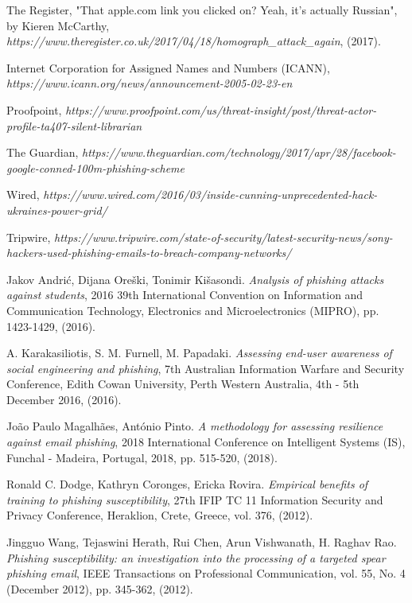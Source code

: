 \documentclass[a4paper]{article}
\begin{document}
\begin{thebibliography}{1}
The Register, "That apple.com link you clicked on? Yeah, it's actually Russian", by Kieren McCarthy, \textit{https://www.theregister.co.uk/2017/04/18/homograph\_attack\_again}, (2017).

Internet Corporation for Assigned Names and Numbers (ICANN),
\textit{https://www.icann.org/news/announcement-2005-02-23-en}

Proofpoint, \textit{https://www.proofpoint.com/us/threat-insight/post/threat-actor-profile-ta407-silent-librarian}

The Guardian, \textit{https://www.theguardian.com/technology/2017/apr/28/facebook-google-conned-100m-phishing-scheme}

Wired, \textit{https://www.wired.com/2016/03/inside-cunning-unprecedented-hack-ukraines-power-grid/}

Tripwire, \textit{https://www.tripwire.com/state-of-security/latest-security-news/sony-hackers-used-phishing-emails-to-breach-company-networks/}


Jakov Andrić, Dijana Oreški, Tonimir Kišasondi. \emph{Analysis of phishing attacks against students}, 2016 39th International Convention on Information and Communication Technology, Electronics and Microelectronics (MIPRO), pp. 1423-1429, (2016).

A. Karakasiliotis, S. M. Furnell, M. Papadaki. \emph{Assessing end-user awareness of social engineering
and phishing}, 7th Australian Information Warfare and Security Conference, Edith Cowan University, Perth Western Australia, 4th - 5th December 2016, (2016).

João Paulo Magalhães, António Pinto. \emph{A methodology for assessing resilience against email phishing}, 2018 International Conference on Intelligent Systems (IS), Funchal - Madeira, Portugal, 2018, pp. 515-520, (2018).

Ronald C. Dodge, Kathryn Coronges, Ericka Rovira. \emph{Empirical benefits of training to phishing susceptibility}, 27th IFIP TC 11 Information Security and Privacy Conference, Heraklion, Crete, Greece, vol. 376, (2012).

Jingguo Wang, Tejaswini Herath, Rui Chen, Arun Vishwanath, H. Raghav Rao. \emph{Phishing susceptibility: an investigation into the processing of a targeted spear phishing email}, IEEE Transactions on Professional Communication, vol. 55, No. 4 (December 2012), pp. 345-362, (2012).


\end{thebibliography}
\end{document}
